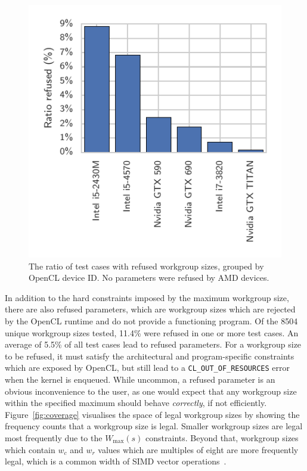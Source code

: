 \documentclass[nonatbib,preprint,10pt]{sigplanconf}
\begin{document}
\begin{figure}
  \centering
  \centering
  \includegraphics[width=.75\columnwidth]{img/refused_params_by_device}
  \caption[Refused workgroup sizes by device and vendor]{%
    The ratio of test cases with refused workgroup sizes, grouped by
    OpenCL device ID. %
    No parameters were refused by AMD devices.%
  }
\label{fig:refused-params-by-dev}
\end{figure}

In addition to the hard constraints imposed by the maximum workgroup
size, there are also refused parameters, which are workgroup sizes
which are rejected by the OpenCL runtime and do not provide a
functioning program. Of the 8504 unique workgroup sizes tested, 11.4\%
were refused in one or more test cases. An average of 5.5\% of all
test cases lead to refused parameters. For a workgroup size to be
refused, it must satisfy the architectural and program-specific
constraints which are exposed by OpenCL, but still lead to a
\texttt{CL\_OUT\_OF\_RESOURCES} error when the kernel is enqueued.
While uncommon, a refused parameter is an obvious inconvenience to the
user, as one would expect that any workgroup size within the specified
maximum should behave \emph{correctly}, if not
efficiently. Figure~\ref{fig:coverage} visualises the space of legal
workgroup sizes by showing the frequency counts that a workgroup size
is legal. Smaller workgroup sizes are legal most frequently due to the
$W_{\max}(s)$ constraints. Beyond that, workgroup sizes which contain
$w_c$ and $w_r$ values which are multiples of eight are more
frequently legal, which is a common width of SIMD vector
operations~\cite{IntelCorporation2012}.
\end{document}
